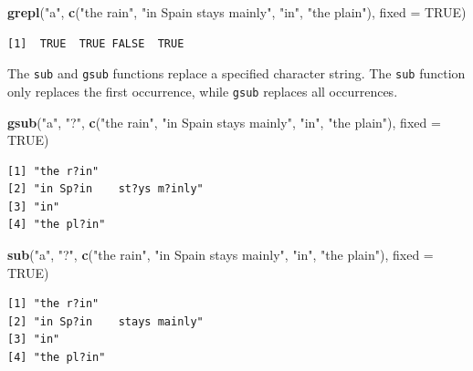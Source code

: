 \documentclass[
]{krantz}
\makeatletter
\newenvironment{Shaded}{\begin{snugshade}}{\end{snugshade}}
\newcommand{\DataTypeTok}[1]{\textcolor[rgb]{0.27,0.27,0.27}{#1}}
\newcommand{\KeywordTok}[1]{\textcolor[rgb]{0.27,0.27,0.27}{\textbf{#1}}}
\newcommand{\NormalTok}[1]{#1}
\newcommand{\OtherTok}[1]{\textcolor[rgb]{0.37,0.37,0.37}{#1}}
\newcommand{\StringTok}[1]{\textcolor[rgb]{0.5,0.5,0.5}{#1}}
\newenvironment{kframe}{%
\medskip{}
\setlength{\fboxsep}{.8em}
 \def\at@end@of@kframe{}%
 \ifinner\ifhmode%
  \def\at@end@of@kframe{\end{minipage}}%
  \begin{minipage}{\columnwidth}%
 \fi\fi%
 \def\FrameCommand##1{\hskip\@totalleftmargin \hskip-\fboxsep
 \colorbox{shadecolor}{##1}\hskip-\fboxsep
     \hskip-\linewidth \hskip-\@totalleftmargin \hskip\columnwidth}%
 \MakeFramed {\advance\hsize-\width
   \@totalleftmargin\z@ \linewidth\hsize
   \@setminipage}}%
 {\par\unskip\endMakeFramed%
 \at@end@of@kframe}
\renewenvironment{Shaded}{\begin{kframe}}{\end{kframe}}
\makeatother
\begin{document}
\begin{Shaded}
\begin{Highlighting}[]
\KeywordTok{grepl}\NormalTok{(}\StringTok{"a"}\NormalTok{, }\KeywordTok{c}\NormalTok{(}\StringTok{"the rain"}\NormalTok{, }\StringTok{"in Spain    stays mainly"}\NormalTok{, }\StringTok{"in"}\NormalTok{, }\StringTok{"the plain"}\NormalTok{), }
      \DataTypeTok{fixed =} \OtherTok{TRUE}\NormalTok{)}
\end{Highlighting}
\end{Shaded}

\begin{verbatim}
[1]  TRUE  TRUE FALSE  TRUE
\end{verbatim}

The \texttt{sub} and \texttt{gsub} functions replace a specified character string. The \texttt{sub} function only replaces the first occurrence, while \texttt{gsub} replaces all occurrences.

\begin{Shaded}
\begin{Highlighting}[]
\KeywordTok{gsub}\NormalTok{(}\StringTok{"a"}\NormalTok{, }\StringTok{"?"}\NormalTok{, }\KeywordTok{c}\NormalTok{(}\StringTok{"the rain"}\NormalTok{, }\StringTok{"in Spain    stays mainly"}\NormalTok{, }\StringTok{"in"}\NormalTok{, }
                 \StringTok{"the plain"}\NormalTok{), }\DataTypeTok{fixed =} \OtherTok{TRUE}\NormalTok{)}
\end{Highlighting}
\end{Shaded}

\begin{verbatim}
[1] "the r?in"                
[2] "in Sp?in    st?ys m?inly"
[3] "in"                      
[4] "the pl?in"               
\end{verbatim}

\begin{Shaded}
\begin{Highlighting}[]
\KeywordTok{sub}\NormalTok{(}\StringTok{"a"}\NormalTok{, }\StringTok{"?"}\NormalTok{, }\KeywordTok{c}\NormalTok{(}\StringTok{"the rain"}\NormalTok{, }\StringTok{"in Spain    stays mainly"}\NormalTok{, }\StringTok{"in"}\NormalTok{, }
                \StringTok{"the plain"}\NormalTok{), }\DataTypeTok{fixed =} \OtherTok{TRUE}\NormalTok{)}
\end{Highlighting}
\end{Shaded}

\begin{verbatim}
[1] "the r?in"                
[2] "in Sp?in    stays mainly"
[3] "in"                      
[4] "the pl?in"               
\end{verbatim}
\end{document}
